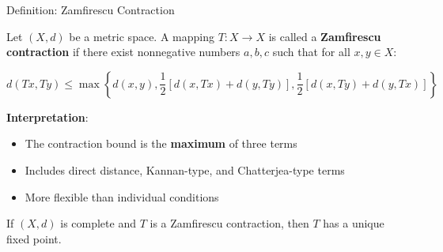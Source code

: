 \documentclass[aspectratio=169,10pt]{beamer}
\begin{document}
\begin{frame}{Definition: Zamfirescu Contraction}
    \begin{definition}[Zamfirescu, 1972]
        Let $(X, d)$ be a metric space. A mapping $T : X \to X$ is called a
        \textbf{Zamfirescu contraction} if there exist nonnegative numbers
        $a, b, c$ such that for all $x, y \in X$:

        \begin{equation}
            d(Tx, Ty) \leq \max\left\{d(x,y), \frac{1}{2}[d(x,Tx) + d(y,Ty)],
            \frac{1}{2}[d(x,Ty) + d(y,Tx)]\right\}
            \label{eq:zamfirescu}
        \end{equation}
    \end{definition}

    \vspace{0.4cm}
    \textbf{Interpretation}:
    \begin{itemize}
        \item The contraction bound is the \textbf{maximum} of three terms
        \item Includes direct distance, Kannan-type, and Chatterjea-type terms
        \item More flexible than individual conditions
    \end{itemize}

    \vspace{0.3cm}
    \begin{theorem}
        If $(X, d)$ is complete and $T$ is a Zamfirescu contraction,
        then $T$ has a unique fixed point.
    \end{theorem}
\end{frame}
\end{document}
